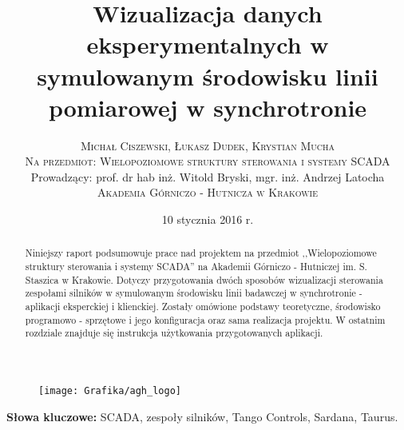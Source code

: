 \documentclass[twoside]{article}
\title{\vspace{-15mm}\fontsize{24pt}{10pt}\selectfont\textbf{Wizualizacja danych eksperymentalnych w symulowanym środowisku linii pomiarowej w synchrotronie}} %
\author{
\large
\textsc{Michał Ciszewski, Łukasz Dudek, Krystian Mucha}\\[3mm] %
\textsc{Na przedmiot: Wielopoziomowe struktury sterowania i systemy SCADA}\\[3mm] %
\normalsize Prowadzący: prof. dr hab inż. Witold Bryski, mgr. inż. Andrzej Latocha\\[9mm]
\textsc{Akademia Górniczo - Hutnicza w Krakowie} %
}
\date{10 stycznia 2016 r.}
\begin{document}
	
\begin{figure}
	\centering
	\texttt{[image: Grafika/agh\_logo]}
	\label{fig:agh-logo}
\end{figure}

\maketitle %

\thispagestyle{fancy} %

\clearpage


\vspace{10mm}
\begin{abstract}

\noindent Niniejszy raport podsumowuje prace nad projektem na przedmiot ,,Wielopoziomowe struktury sterowania i systemy SCADA'' na Akademii Górniczo - Hutniczej im. S. Staszica w Krakowie. Dotyczy przygotowania dwóch sposobów wizualizacji sterowania zespołami silników w symulowanym środowisku linii badawczej w synchrotronie - aplikacji eksperckiej i klienckiej. Zostały omówione podstawy teoretyczne, środowisko programowo - sprzętowe i jego konfiguracja oraz sama realizacja projektu. W ostatnim rozdziale znajduje się instrukcja użytkowania przygotowanych aplikacji.

\end{abstract}

\smallskip
\noindent \textbf{Słowa kluczowe:} SCADA, zespoły silników, Tango Controls, Sardana, Taurus.

\tableofcontents




















\end{document}
